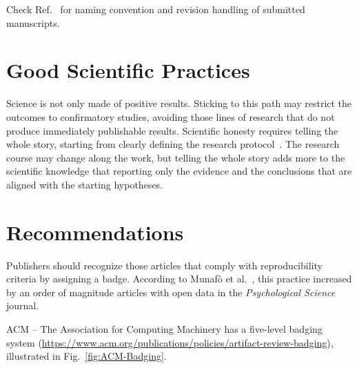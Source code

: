 \documentclass[journal,twopage]{IEEEtran}
\begin{document}
Check Ref.~\cite{EditorialGRSL2015} for naming convention and revision handling of submitted manuscripts.


\section{Good Scientific Practices}

Science is not only made of positive results.
Sticking to this path may restrict the outcomes to confirmatory studies, avoiding those lines of research that do not produce immediately publishable results.
Scientific honesty requires telling the whole story, starting from clearly defining the research protocol~\cite{TellItlikeItIs}.
The research course may change along the work, but telling the whole story adds more to the scientific knowledge that reporting only the evidence and the conclusions that are aligned with the starting hypotheses.

\section{Recommendations}

Publishers should recognize those articles that comply with reproducibility criteria by assigning a badge.
According to Munaf\`o et al.~\cite{ManifestoReproducibleScience}, this practice increased by an order of magnitude articles with open data in the \textit{Psychological Science} journal.

ACM -- The Association for Computing Machinery has a five-level badging system (\url{https://www.acm.org/publications/policies/artifact-review-badging}), illustrated in Fig.~\ref{fig:ACM-Badging}.
\end{document}
